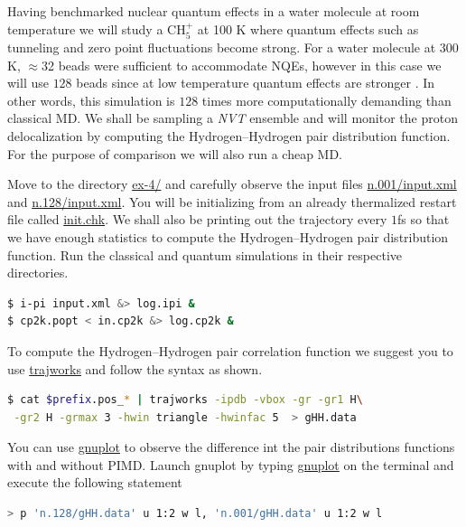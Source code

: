 \documentclass{article}
\begin{document}
\begin{Exercise}[label={ch5},title={PIMD in the strong quantum regime:  gas phase Methanium}]
\noindent Having benchmarked nuclear quantum effects in a water molecule at room temperature 
we will study a $\text{CH}_{5}^{+}$ at 100 K where quantum effects such as tunneling and 
zero point fluctuations become strong. For a water molecule at $300$K, $\approx$32 beads were 
sufficient to accommodate NQEs, however in this case we will use $128$ beads since at low 
temperature quantum effects are stronger . In other words, this simulation is $128$ times more computationally 
demanding than classical MD. We shall be sampling a \emph{NVT} ensemble and will monitor the 
proton delocalization by computing the Hydrogen--Hydrogen pair distribution function. For the 
purpose of comparison we will also run a cheap MD.

\Question
Move to the directory \url{ex-4/} and carefully observe the \ipi{} input files \url{n.001/input.xml} 
and \url{n.128/input.xml}. You will be initializing from an already thermalized restart file called 
\url{init.chk}. We shall also be printing out the trajectory every $1$fs so that we have enough 
statistics to compute the Hydrogen--Hydrogen pair distribution function. Run the classical and 
quantum simulations in their respective directories.

\begin{lstlisting}[language=bash]
$ i-pi input.xml &> log.ipi &
$ cp2k.popt < in.cp2k &> log.cp2k &
\end{lstlisting}

\Question
To compute the Hydrogen--Hydrogen pair correlation function we suggest you to use \url{trajworks} and follow the syntax as shown. 
\begin{lstlisting}[language=bash]
$ cat $prefix.pos_* | trajworks -ipdb -vbox -gr -gr1 H\
 -gr2 H -grmax 3 -hwin triangle -hwinfac 5  > gHH.data 
\end{lstlisting}

\Question
You can use \url{gnuplot} to observe the difference int the pair distributions functions with and without PIMD. 
Launch gnuplot by typing \url{gnuplot} on the terminal and execute the following statement 
\begin{lstlisting}[language=bash]
> p 'n.128/gHH.data' u 1:2 w l, 'n.001/gHH.data' u 1:2 w l
\end{lstlisting}

\end{Exercise}



\end{document}
